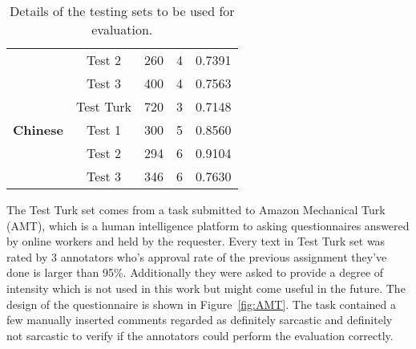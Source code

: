 \documentclass[12pt,a4paper]{report}
\theoremstyle{definition}
\begin{document}
\begin{CJK}{UTF8}{bsmi}
\begin{table}[H]
\begin{tabular}{l|c|c|c|c}
\multicolumn{1}{c|}{}                         & Test 2                           & 260                                 & 4                                     & 0.7391                            \\
\multicolumn{1}{c|}{}                         & Test 3                           & 400                                 & 4                                     & 0.7563                            \\
\multicolumn{1}{c|}{}                         & Test Turk                        & 720                                 & 3                                     & 0.7148                            \\ \hline
\textbf{Chinese}                      & Test 1                           & 300                                 & 5                                     & 0.8560                            \\
                                              & Test 2                           & 294                                 & 6                                     & 0.9104                            \\
                                              & Test 3                           & 346                                 & 6                                     & 0.7630                            \\ \hline
\end{tabular}
\caption{Details of the testing sets to be used for evaluation.}
\label{tab:testing}
\end{table}
    \par The Test Turk set comes from a task submitted to Amazon Mechanical Turk (AMT), which is a human intelligence platform to asking questionnaires answered by online workers and held by the requester. Every text in Test Turk set was rated by 3 annotators who's approval rate of the previous assignment they've done is larger than 95\%. Additionally they were asked to provide a degree of intensity which is not used in this work but might come useful in the future. The design of the questionnaire is shown in Figure~\ref{fig:AMT}. The task contained a few manually inserted comments regarded as definitely sarcastic and definitely not sarcastic to verify if the annotators could perform the evaluation correctly.


\end{CJK}
\end{document}
